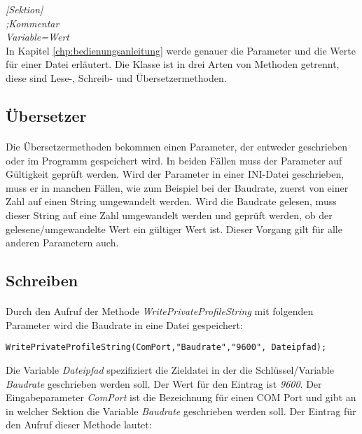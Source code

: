 \hspace*{20mm}\textit{[Sektion]}    \\
\hspace*{20mm}\textit{;Kommentar}    \\
\hspace*{20mm}\textit{Variable=Wert}\\

In Kapitel \ref{chp:bedienungsanleitung} werde genauer die Parameter und die Werte für einer Datei erläutert. Die Klasse ist in drei Arten von Methoden getrennt, diese sind Lese-, Schreib- und Übersetzermethoden.\\

\subsection{Übersetzer}
\paragraph{}
Die Übersetzermethoden bekommen einen Parameter, der entweder geschrieben oder im Programm gespeichert wird. In beiden Fällen muss der Parameter auf Gültigkeit geprüft werden. Wird der Parameter in einer INI-Datei geschrieben, muss er in manchen Fällen, wie zum Beispiel bei der Baudrate, zuerst von einer Zahl auf einen String umgewandelt werden. Wird die Baudrate gelesen, muss dieser String auf eine Zahl umgewandelt werden und geprüft werden, ob der gelesene/umgewandelte Wert ein gültiger Wert ist. Dieser Vorgang gilt für alle anderen Parametern auch.



\subsection{Schreiben}
\paragraph{}
Durch den Aufruf der Methode \textit{WritePrivateProfileString} mit folgenden Parameter wird die Baudrate in eine Datei gespeichert:\\

\begin{lstlisting}
WritePrivateProfileString(ComPort,"Baudrate","9600", Dateipfad);
\end{lstlisting}

Die Variable \textit{Dateipfad} spezifiziert die Zieldatei in der die Schlüssel/Variable \textit{Baudrate} geschrieben werden soll. Der Wert für den Eintrag ist \textit{9600}. Der Eingabeparameter \textit{ComPort} ist die Bezeichnung für einen COM Port und gibt an in welcher Sektion die Variable \textit{Baudrate} geschrieben werden soll. Der Eintrag für den Aufruf dieser Methode lautet:\\

